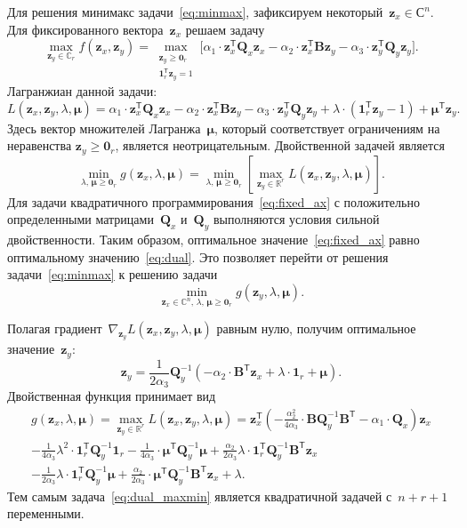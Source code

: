 \documentclass[preprint,12pt]{elsarticle}
\theoremstyle{definition}
\newcommand{\bz}{\mathbf{z}}
\newcommand{\bB}{\mathbf{B}}
\newcommand{\bQ}{\mathbf{Q}}
\newcommand{\bbR}{\mathbb{R}}
\newcommand{\T}{\mathsf{T}}
\newcommand{\bmu}{\boldsymbol{\mu}}
\newcommand{\bOne}{\boldsymbol{1}}
\newcommand{\bZero}{\boldsymbol{0}}
\begin{document}
Для решения минимакс задачи~\eqref{eq:minmax}, зафиксируем некоторый~$\bz_x \in \mathbb{С}^n$. Для фиксированного вектора~$\bz_x$ решаем задачу
\begin{equation}
\max_{\bz_y \in \mathbb{C}_r} f(\bz_x, \bz_y) = \max_{\substack{\bz_y \geq \bZero_r \\ \bOne_r^{\T}\bz_y=1}} \bigl[\alpha_1 \cdot \bz_x^{\T} \bQ_x \bz_x - \alpha_2 \cdot \bz_x^{\T} \bB \bz_y - \alpha_3 \cdot \bz_y^{\T} \bQ_y \bz_y \bigr].
\label{eq:fixed_ax}
\end{equation}
Лагранжиан данной задачи:
\begin{equation*}
L(\bz_x, \bz_y, \lambda, \bmu) = \alpha_1 \cdot \bz_x^{\T} \bQ_x \bz_x - \alpha_2 \cdot \bz_x^{\T} \bB \bz_y - \alpha_3 \cdot \bz_y^{\T} \bQ_y \bz_y + \lambda \cdot  (\bOne_r^{\T} \bz_y - 1) + \bmu^{\T} \bz_y.
\end{equation*}
Здесь вектор множителей Лагранжа~$\bmu$, который соответствует ограничениям на неравенства $\bz_y \geq \bZero_r$, является неотрицательным.
Двойственной задачей является
\begin{equation}
\min_{\lambda, \, \bmu \geq \bZero_r} g(\bz_x, \lambda, \bmu) = \min_{\lambda, \, \bmu \geq \bZero_r}  \left[\max_{\bz_y \in \bbR^r} L(\bz_x, \bz_y, \lambda, \bmu) \right].
\label{eq:dual}
\end{equation}
Для задачи квадратичного программирования~\eqref{eq:fixed_ax} с положительно определенными матрицами~$\bQ_x$ и~$\bQ_y$ выполняются условия сильной двойственности. Таким образом, оптимальное значение~\eqref{eq:fixed_ax} равно оптимальному значению~\eqref{eq:dual}. Это позволяет перейти от решения задачи~\eqref{eq:minmax} к решению задачи
\begin{equation}
\min_{\bz_x \in \mathbb{C}^n, \, \lambda, \, \bmu \geq \bZero_r} g(\bz_y, \lambda, \bmu).
\label{eq:dual_maxmin}
\end{equation}

Полагая градиент~$\nabla_{\bz_y} L(\bz_x, \bz_y, \lambda, \bmu)$ равным нулю, получим оптимальное значение~$\bz_y$:
\begin{equation}
\bz_y = \frac{1}{2\alpha_3} \bQ_y^{-1} \left( - \alpha_2 \cdot \bB^{\T} \bz_x +\lambda \cdot \bOne_r + \bmu \right).
\label{eq:ax}
\end{equation}
Двойственная функция принимает вид
\begin{multline}
g(\bz_x, \lambda, \bmu)
= \max_{\bz_y \in \bbR^r} L(\bz_x, \bz_y, \lambda, \bmu) =
\bz_x^{\T} \left( - \frac{\alpha_2^2}{4\alpha_3} \cdot \bB \bQ_y^{-1} \bB^{\T} - \alpha_1 \cdot \bQ_x\right) \bz_x \\ - \frac{1}{4 \alpha_3} \lambda^2 \cdot \bOne_r^{\T} \bQ_y^{-1} \bOne_r - \frac{1}{4 \alpha_3} \cdot \bmu^{\T} \bQ_y^{-1} \bmu + \frac{\alpha_2}{2 \alpha_3} \lambda \cdot \bOne_r^{\T} \bQ_y^{-1} \bB^{\T} \bz_x \\ - \frac{1}{2 \alpha_3} \lambda \cdot \bOne_r^{\T} \bQ_y^{-1} \bmu + \frac{\alpha_2}{2 \alpha_3} \cdot \bmu^{\T} \bQ_y^{-1} \bB^{\T} \bz_x + \lambda.
\label{eq:dual_quadratic_form}
\end{multline}
Тем самым задача~\eqref{eq:dual_maxmin} является квадратичной задачей с~$n + r + 1$ переменными.
\end{document}
